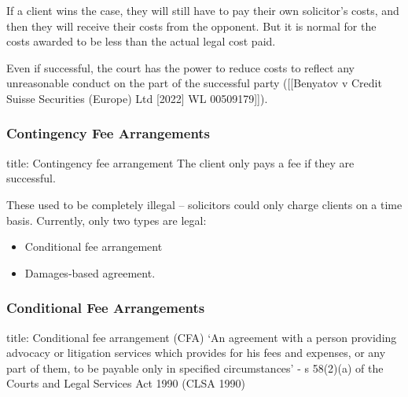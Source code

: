 \documentclass[
]{article}
\newenvironment{Shaded}{}{}
\newcommand{\NormalTok}[1]{#1}
\providecommand{\tightlist}{%
  \setlength{\itemsep}{0pt}\setlength{\parskip}{0pt}}
\begin{document}
If a client wins the case, they will still have to pay their own
solicitor's costs, and then they will receive their costs from the
opponent. But it is normal for the costs awarded to be less than the
actual legal cost paid.

Even if successful, the court has the power to reduce costs to reflect
any unreasonable conduct on the part of the successful party
({[}{[}Benyatov v Credit Suisse Securities (Europe) Ltd {[}2022{]} WL
00509179{]}{]}).

\hypertarget{contingency-fee-arrangements}{%
\subsubsection{Contingency Fee
Arrangements}\label{contingency-fee-arrangements}}

\begin{Shaded}
\begin{Highlighting}[]
\NormalTok{title: Contingency fee arrangement}
\NormalTok{The client only pays a fee if they are successful.}
\end{Highlighting}
\end{Shaded}

These used to be completely illegal -- solicitors could only charge
clients on a time basis. Currently, only two types are legal:

\begin{itemize}
\tightlist
\item
  Conditional fee arrangement
\item
  Damages-based agreement.
\end{itemize}

\hypertarget{conditional-fee-arrangements}{%
\subsubsection{Conditional Fee
Arrangements}\label{conditional-fee-arrangements}}

\begin{Shaded}
\begin{Highlighting}[]
\NormalTok{title: Conditional fee arrangement (CFA)}
\NormalTok{‘An agreement with a person providing advocacy or litigation services which provides for his fees and expenses, or any part of them, to be payable only in specified circumstances’ {-} s 58(2)(a) of the Courts and Legal Services Act 1990 (CLSA 1990)}
\end{Highlighting}
\end{Shaded}
\end{document}
